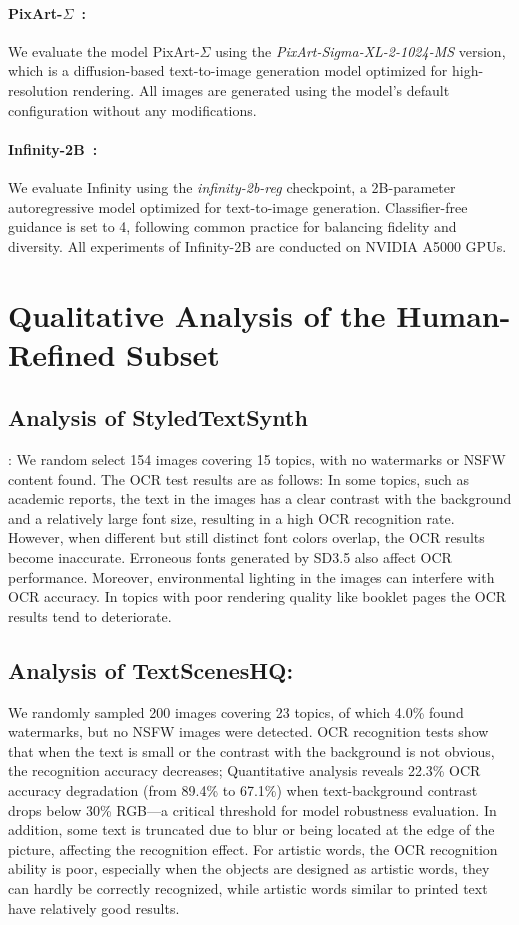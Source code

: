 \paragraph{PixArt-$\Sigma$~\cite{chen2024pixart}:}
We evaluate the model PixArt-$\Sigma$ using the \textit{PixArt-Sigma-XL-2-1024-MS} version, which is a diffusion-based text-to-image generation model optimized for high-resolution rendering. All images are generated using the model's default configuration without any modifications.


\paragraph{Infinity-2B~\cite{han2024infinity}:}
We evaluate Infinity using the \textit{infinity-2b-reg} checkpoint, a 2B-parameter autoregressive model optimized for text-to-image generation. Classifier-free guidance is set to 4, following common practice for balancing fidelity and diversity. All experiments of Infinity-2B are conducted on NVIDIA A5000 GPUs.




\section{Qualitative Analysis of the Human-Refined Subset}

\subsection{Analysis of StyledTextSynth}:
We random select 154 images covering 15 topics, with no watermarks or NSFW content found.
The OCR test results are as follows:
In some topics, such as academic reports, the text in the images has a clear contrast with the background and a relatively large font size, resulting in a high OCR recognition rate. 
However, when different but still distinct font colors overlap, the OCR results become inaccurate. 
Erroneous fonts generated by SD3.5 also affect OCR performance. 
Moreover, environmental lighting in the images can interfere with OCR accuracy. 
In topics with poor rendering quality like booklet pages the OCR results tend to deteriorate.

\subsection{Analysis of TextScenesHQ:} 
We randomly sampled 200 images covering 23 topics, of which 4.0\% found watermarks, but no NSFW images were detected. OCR recognition tests show that when the text is small or the contrast with the background is not obvious, the recognition accuracy decreases;
Quantitative analysis reveals 22.3\% OCR accuracy degradation (from 89.4\% to 67.1\%) when text-background contrast drops below 30\% RGB—a critical threshold for model robustness evaluation.
In addition, some text is truncated due to blur or being located at the edge of the picture, affecting the recognition effect. For artistic words, the OCR recognition ability is poor, especially when the objects are designed as artistic words, they can hardly be correctly recognized, while artistic words similar to printed text have relatively good results.

